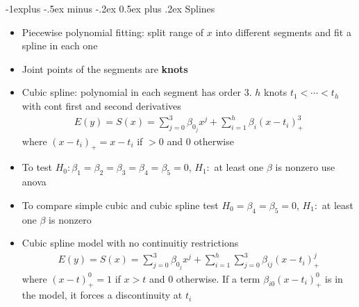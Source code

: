 \documentclass[frenchspacing,9pt,landscape,a4paper]{article}
\makeatletter
\renewcommand{\subsection}{\@startsection{subsection}{2}{0mm}%
                                {-1explus -.5ex minus -.2ex}%
                                {0.5ex plus .2ex}%
                                {\normalfont\normalsize\bfseries}}
\makeatother
\begin{document}
\begin{multicols}{3}
\subsection{Splines}
\begin{itemize}
	\item Piecewise polynomial fitting: split range of $x$ into different segments and fit a spline in each one
	\item Joint points of the segments are \textbf{knots}
	\item Cubic spline: polynomial in each segment has order 3. $h$ knots $t_1<\cdots<t_h$ with cont first and second derivatives
		\begin{align*}
			E(y)=S(x)=\sum_{j=0}^3\beta_{0_j}x^j+\sum_{i=1}^h\beta_i(x-t_i)_+^3
		\end{align*} where $(x-t_i)_+=x-t_i$ if $>0$ and $0$ otherwise
	\item To test $H_0:\beta_1=\beta_2=\beta_3=\beta_4=\beta_5=0$, $H_1:$ at least one $\beta$ is nonzero use anova
	\item To compare simple cubic and cubic spline test  $H_0=\beta_4=\beta_5=0$, $H_1:$ at least one $\beta$ is nonzero
	\item Cubic spline model with no continuitiy restrictions
		\begin{align*}
			E(y)=S(x)=\sum_{j=0}^3\beta_{0_j}x^j+\sum_{i=1}^h\sum_{j=0}^3\beta_{ij}(x-t_i)_+^j
		\end{align*} where $(x-t)_+^0=1$ if $x>t$ and $0$ otherwise. If a term  $\beta_{i0}(x-t_i)_+^0$ is in the model, it forces a discontinuity at $t_i$
\end{itemize}

\end{multicols}
\end{document}
